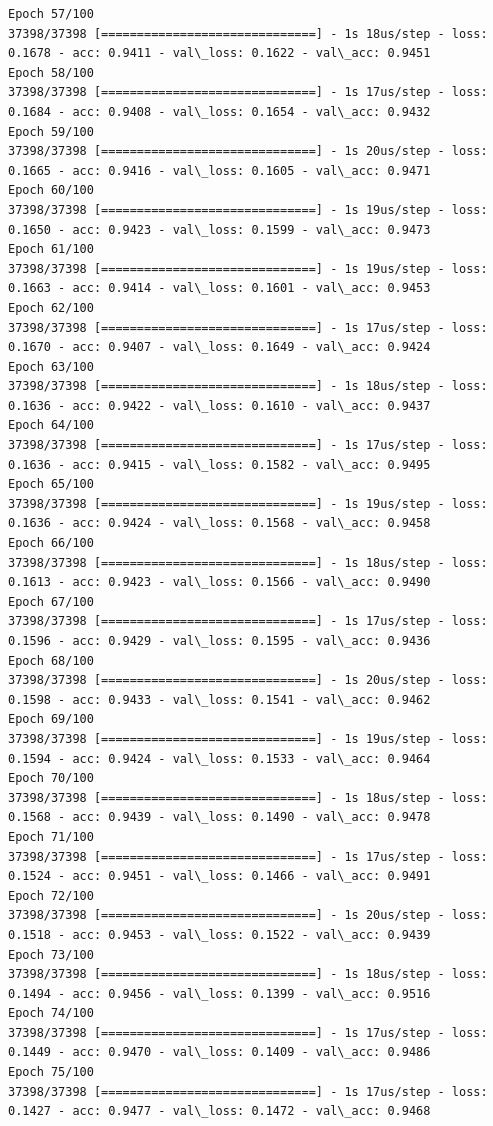 \documentclass[11pt]{article}
\begin{document}
\begin{Verbatim}[commandchars=\\\{\}]
Epoch 57/100
37398/37398 [==============================] - 1s 18us/step - loss: 0.1678 - acc: 0.9411 - val\_loss: 0.1622 - val\_acc: 0.9451
Epoch 58/100
37398/37398 [==============================] - 1s 17us/step - loss: 0.1684 - acc: 0.9408 - val\_loss: 0.1654 - val\_acc: 0.9432
Epoch 59/100
37398/37398 [==============================] - 1s 20us/step - loss: 0.1665 - acc: 0.9416 - val\_loss: 0.1605 - val\_acc: 0.9471
Epoch 60/100
37398/37398 [==============================] - 1s 19us/step - loss: 0.1650 - acc: 0.9423 - val\_loss: 0.1599 - val\_acc: 0.9473
Epoch 61/100
37398/37398 [==============================] - 1s 19us/step - loss: 0.1663 - acc: 0.9414 - val\_loss: 0.1601 - val\_acc: 0.9453
Epoch 62/100
37398/37398 [==============================] - 1s 17us/step - loss: 0.1670 - acc: 0.9407 - val\_loss: 0.1649 - val\_acc: 0.9424
Epoch 63/100
37398/37398 [==============================] - 1s 18us/step - loss: 0.1636 - acc: 0.9422 - val\_loss: 0.1610 - val\_acc: 0.9437
Epoch 64/100
37398/37398 [==============================] - 1s 17us/step - loss: 0.1636 - acc: 0.9415 - val\_loss: 0.1582 - val\_acc: 0.9495
Epoch 65/100
37398/37398 [==============================] - 1s 19us/step - loss: 0.1636 - acc: 0.9424 - val\_loss: 0.1568 - val\_acc: 0.9458
Epoch 66/100
37398/37398 [==============================] - 1s 18us/step - loss: 0.1613 - acc: 0.9423 - val\_loss: 0.1566 - val\_acc: 0.9490
Epoch 67/100
37398/37398 [==============================] - 1s 17us/step - loss: 0.1596 - acc: 0.9429 - val\_loss: 0.1595 - val\_acc: 0.9436
Epoch 68/100
37398/37398 [==============================] - 1s 20us/step - loss: 0.1598 - acc: 0.9433 - val\_loss: 0.1541 - val\_acc: 0.9462
Epoch 69/100
37398/37398 [==============================] - 1s 19us/step - loss: 0.1594 - acc: 0.9424 - val\_loss: 0.1533 - val\_acc: 0.9464
Epoch 70/100
37398/37398 [==============================] - 1s 18us/step - loss: 0.1568 - acc: 0.9439 - val\_loss: 0.1490 - val\_acc: 0.9478
Epoch 71/100
37398/37398 [==============================] - 1s 17us/step - loss: 0.1524 - acc: 0.9451 - val\_loss: 0.1466 - val\_acc: 0.9491
Epoch 72/100
37398/37398 [==============================] - 1s 20us/step - loss: 0.1518 - acc: 0.9453 - val\_loss: 0.1522 - val\_acc: 0.9439
Epoch 73/100
37398/37398 [==============================] - 1s 18us/step - loss: 0.1494 - acc: 0.9456 - val\_loss: 0.1399 - val\_acc: 0.9516
Epoch 74/100
37398/37398 [==============================] - 1s 17us/step - loss: 0.1449 - acc: 0.9470 - val\_loss: 0.1409 - val\_acc: 0.9486
Epoch 75/100
37398/37398 [==============================] - 1s 17us/step - loss: 0.1427 - acc: 0.9477 - val\_loss: 0.1472 - val\_acc: 0.9468

\end{Verbatim}
\end{document}
